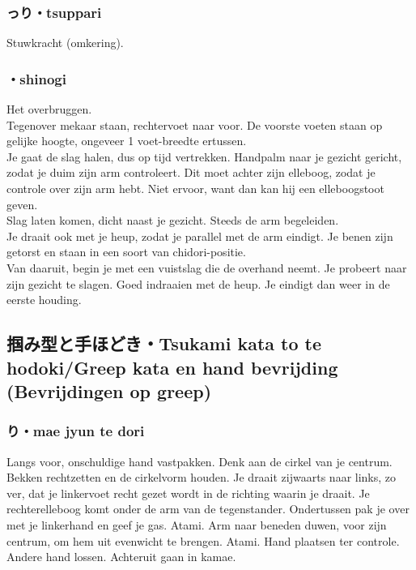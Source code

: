 \subsubsection{っり・tsuppari}
Stuwkracht (omkering).

\subsubsection{・shinogi}
Het overbruggen.\\
Tegenover mekaar staan, rechtervoet naar voor. De voorste voeten staan op gelijke hoogte, ongeveer 1 voet-breedte ertussen.\\
Je gaat de slag halen, dus op tijd vertrekken. Handpalm naar je gezicht gericht, zodat je duim zijn arm controleert. Dit moet achter zijn elleboog, zodat je controle over zijn arm hebt. Niet ervoor, want dan kan hij een elleboogstoot geven.\\
Slag laten komen, dicht naast je gezicht. Steeds de arm begeleiden.\\
Je draait ook met je heup, zodat je parallel met de arm eindigt. Je benen zijn getorst en staan in een soort van chidori-positie.\\
Van daaruit, begin je met een vuistslag die de overhand neemt. Je probeert naar zijn gezicht te slagen. Goed indraaien met de heup. Je eindigt dan weer in de eerste houding.

\subsection{掴み型と手ほどき・Tsukami kata to te hodoki/Greep kata en hand bevrijding (Bevrijdingen op greep)}
\subsubsection{り・mae jyun te dori}
Langs voor, onschuldige hand vastpakken. Denk aan de cirkel van je centrum. Bekken rechtzetten en de cirkelvorm houden.
Je draait zijwaarts naar links, zo ver, dat je linkervoet recht gezet wordt in de richting waarin je draait. Je rechterelleboog komt onder de arm van de tegenstander. Ondertussen pak je over met je linkerhand en geef je gas. Atami. Arm naar beneden duwen, voor zijn centrum, om hem uit evenwicht te brengen. Atami. Hand plaatsen ter controle. Andere hand lossen. Achteruit gaan in kamae.

